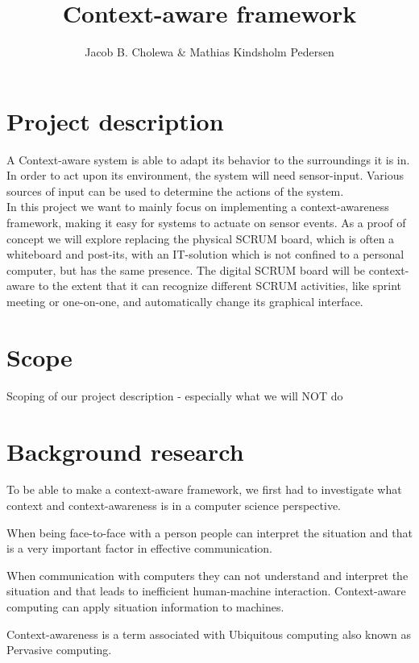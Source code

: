 \documentclass[]{report}
\title{Context-aware framework}
\author{Jacob B. Cholewa \& Mathias Kindsholm Pedersen}
\begin{document}
\maketitle

\begin{abstract}
\end{abstract}


\chapter{Project description}
A Context-aware system is able to adapt its behavior to the surroundings it is in. In order to act upon its environment, the system will need sensor-input. Various sources of input can be used to determine the actions of the system.\\

In this project we want to mainly focus on implementing a context-awareness framework, making it easy for systems to actuate on sensor events. As a proof of concept we will explore replacing the physical SCRUM board, which is often a whiteboard and post-its, with an IT-solution which is not confined to a personal computer, but has the same presence. The digital SCRUM board will be context-aware to the extent that it can recognize different SCRUM activities, like sprint meeting or one-on-one, and automatically change its graphical interface.


\chapter{Scope}
Scoping of our project description - especially what we will NOT do

\chapter{Background research}


To be able to make a context-aware framework, we first had to investigate what context and context-awareness is in a computer science perspective.


When being face-to-face with a person people can interpret the situation and that is a very important factor in effective communication. 

When communication with computers they can not understand and interpret the situation and that leads to inefficient human-machine interaction. Context-aware computing can apply situation information to machines.

Context-awareness is a term associated with Ubiquitous computing also known as Pervasive computing.
\end{document}
